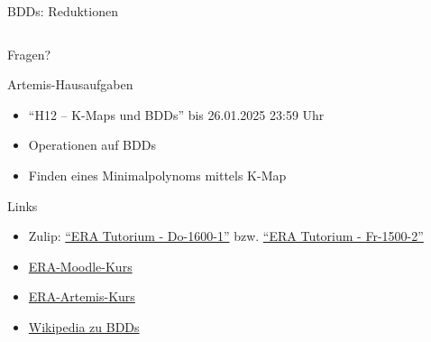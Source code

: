 \documentclass[
  german,            %
  aspectratio=169,    %
]{tumbeamer}
\begin{document}
\begin{frame}[c, fragile]{BDDs: Reduktionen}
\begin{columns}[c]
\begin{column}{0.5\textwidth}
\begin{center}
{
		}
	\end{center}
\end{column}
\end{columns}
\end{frame}


\begin{frame}[c]{}{}
	\begin{center}
		\LARGE Fragen?
	\end{center}
\end{frame}

\begin{frame}[c, fragile]{Artemis-Hausaufgaben}{}
	\begin{itemize}
		\item \enquote{H12 -- K-Maps und BDDs} bis 26.01.2025 23:59 Uhr
		\item Operationen auf BDDs
		\item Finden eines Minimalpolynoms mittels K-Map
	\end{itemize}
\end{frame}

\begin{frame}[c, fragile]{Links}{}
	\begin{itemize}
		\item Zulip: \href{https://zulip.in.tum.de/#narrow/stream/2661-ERA-Tutorium---Do-1600-1}{\enquote{ERA Tutorium - Do-1600-1}}
		      bzw. \href{https://zulip.in.tum.de/#narrow/stream/2675-ERA-Tutorium---Fr-1500-2 }{\enquote{ERA Tutorium - Fr-1500-2}}
		\item \href{https://www.moodle.tum.de/course/view.php?id=100633}{ERA-Moodle-Kurs}
		\item \href{https://artemis.in.tum.de/courses/401}{ERA-Artemis-Kurs}
		\item \href{https://en.wikipedia.org/wiki/Binary_decision_diagram}{Wikipedia zu BDDs}
	\end{itemize}
\end{frame}

\maketitle
\end{document}
